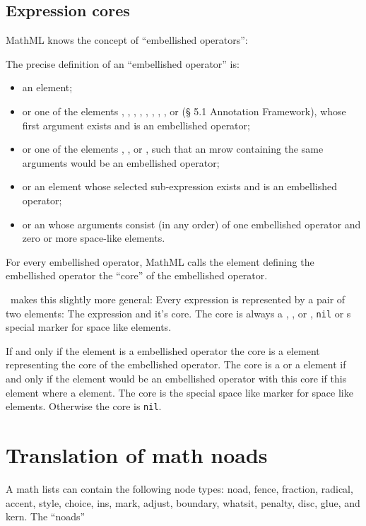 \documentclass{article}
\begin{document}
\subsection{Expression cores}
MathML knows the concept of \enquote{embellished operators}:
\begin{blockquote}
  The precise definition of an \enquote{embellished operator} is:
  \begin{itemize}
    \item an  element;
    \item or one of the elements , , , , , , , , or  (§ 5.1 Annotation Framework), whose first argument exists and is an embellished operator;
    \item or one of the elements , , or , such that an mrow containing the same arguments would be an embellished operator;
    \item or an  element whose selected sub-expression exists and is an embellished operator;
    \item or an  whose arguments consist (in any order) of one embellished operator and zero or more space-like elements.
  \end{itemize}
\end{blockquote}
For every embellished operator, MathML calls the  element defining the embellished operator the \enquote{core} of the embellished operator.

\Luamml\ makes this slightly more general: Every expression is represented by a pair of two elements: The expression and it's core.
The core is always a , , or , \texttt{nil} or s special marker for space like elements.

If and only if the element is a embellished operator the core is a  element representing the core of the embellished operator.
The core is a  or a  element if and only if the element would be an embellished operator with this core if this element where a  element.
The core is the special space like marker for space like elements. Otherwise the core is \texttt{nil}.

\section{Translation of math noads}
A math lists can contain the following node types: noad, fence, fraction, radical, accent, style, choice, ins, mark, adjust, boundary, whatsit, penalty, disc, glue, and kern. The \enquote{noads}
\end{document}
